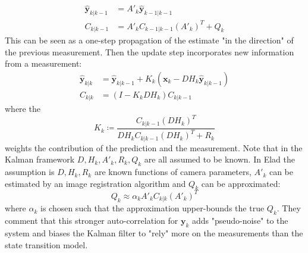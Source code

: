 \begin{align}
    \hat{\bm{y}}_{k|k-1} &= A'_k \hat{\bm{y}}_{k-1|k-1} \\
    C_{k|k-1} &= A'_k C_{k-1|k-1} (A'_k)^T + Q_k
\end{align}
This can be seen as a one-step propagation of the estimate "in the direction" of the previous measurement.
%
Then the update step incorporates new information from a measurement:
\begin{align}
    \hat{\bm{y}}_{k|k} &= \hat{\bm{y}}_{k|k-1} + K_k(\bm{x}_k - DH_k\hat{\bm{y}}_{k|k-1} ) \\
    C_{k|k} &= (I - K_k DH_k)C_{k|k-1}
\end{align}
where the 
\begin{equation}
    K_k \coloneqq \frac{C_{k|k-1}(DH_k)^T}{DH_k C_{k|k-1} (DH_k)^T + R_k }
\end{equation}
weights the contribution of the prediction and the measurement.
%
Note that in the Kalman framework $D, H_k, A'_k, R_k, Q_k$ are all assumed to be known.
%
In Elad \etal\cite{elad1999} the assumption is $D, H_k, R_k$ are known functions of camera parameters, $A'_k$ can be estimated by an image registration algorithm and $Q_k$ can be approximated:
\begin{equation}
    Q_k \approx \alpha_k A'_k C_{k|k} (A'_k)^T
\end{equation}
where $\alpha_k$ is chosen such that the approximation upper-bounds the true $Q_k$.
%
They comment that this stronger auto-correlation for $\bm{y}_k$ adds "pseudo-noise" to the system and biases the Kalman filter to "rely" more on the measurements than the state transition model.

